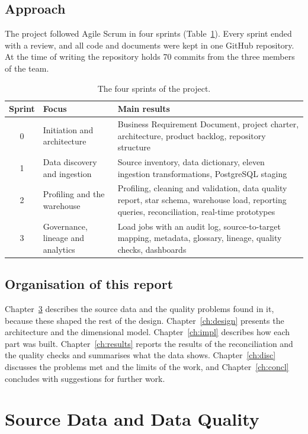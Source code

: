 \documentclass[12pt,a4paper]{report}
\newcommand{\tabsize}{\small}
\begin{document}
\section{Approach}
The project followed Agile Scrum in four sprints (Table~\ref{tab:sprints}). Every sprint ended with a review, and all code and documents were kept in one GitHub repository. At the time of writing the repository holds 70 commits from the three members of the team.

\begin{table}[htbp]
\centering\tabsize
\caption{The four sprints of the project.}\label{tab:sprints}
\begin{tabular}{@{}c p{3.6cm} p{8.4cm}@{}}
\toprule
Sprint & Focus & Main results\\
\midrule
0 & Initiation and architecture & Business Requirement Document, project charter, architecture, product backlog, repository structure\\
1 & Data discovery and ingestion & Source inventory, data dictionary, eleven ingestion transformations, PostgreSQL staging\\
2 & Profiling and the warehouse & Profiling, cleaning and validation, data quality report, star schema, warehouse load, reporting queries, reconciliation, real-time prototypes\\
3 & Governance, lineage and analytics & Load jobs with an audit log, source-to-target mapping, metadata, glossary, lineage, quality checks, dashboards\\
\bottomrule
\end{tabular}
\end{table}

\section{Organisation of this report}
Chapter~\ref{ch:data} describes the source data and the quality problems found in it, because these shaped the rest of the design. Chapter~\ref{ch:design} presents the architecture and the dimensional model. Chapter~\ref{ch:impl} describes how each part was built. Chapter~\ref{ch:results} reports the results of the reconciliation and the quality checks and summarises what the data shows. Chapter~\ref{ch:disc} discusses the problems met and the limits of the work, and Chapter~\ref{ch:concl} concludes with suggestions for further work.

\chapter{Source Data and Data Quality}\label{ch:data}
\end{document}
